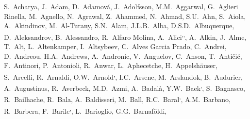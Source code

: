 
%
\begingroup
\small
\begin{flushleft}
S.~Acharya\And, 
J.~Adam\And, 
D.~Adamov\'{a}\And, 
J.~Adolfsson\And, 
M.M.~Aggarwal\And, 
G.~Aglieri Rinella\And, 
M.~Agnello\And, 
N.~Agrawal\And, 
Z.~Ahammed\And, 
N.~Ahmad\And, 
S.U.~Ahn\And, 
S.~Aiola\And, 
A.~Akindinov\And, 
M.~Al-Turany\And, 
S.N.~Alam\And, 
J.L.B.~Alba\And, 
D.S.D.~Albuquerque\And, 
D.~Aleksandrov\And, 
B.~Alessandro\And, 
R.~Alfaro Molina\And, 
A.~Alici\textsuperscript{,}\textsuperscript{,}\And, 
A.~Alkin\And, 
J.~Alme\And, 
T.~Alt\And, 
L.~Altenkamper\And, 
I.~Altsybeev\And, 
C.~Alves Garcia Prado\And, 
C.~Andrei\And, 
D.~Andreou\And, 
H.A.~Andrews\And, 
A.~Andronic\And, 
V.~Anguelov\And, 
C.~Anson\And, 
T.~Anti\v{c}i\'{c}\And, 
F.~Antinori\And, 
P.~Antonioli\And, 
R.~Anwar\And, 
L.~Aphecetche\And, 
H.~Appelsh\"{a}user\And, 
S.~Arcelli\And, 
R.~Arnaldi\And, 
O.W.~Arnold\textsuperscript{,}\And, 
I.C.~Arsene\And, 
M.~Arslandok\And, 
B.~Audurier\And, 
A.~Augustinus\And, 
R.~Averbeck\And, 
M.D.~Azmi\And, 
A.~Badal\`{a}\And, 
Y.W.~Baek\textsuperscript{,}\And, 
S.~Bagnasco\And, 
R.~Bailhache\And, 
R.~Bala\And, 
A.~Baldisseri\And, 
M.~Ball\And, 
R.C.~Baral\textsuperscript{,}\And, 
A.M.~Barbano\And, 
R.~Barbera\And, 
F.~Barile\textsuperscript{,}\And, 
L.~Barioglio\And, 
G.G.~Barnaf\"{o}ldi\And, 

\end{flushleft}
